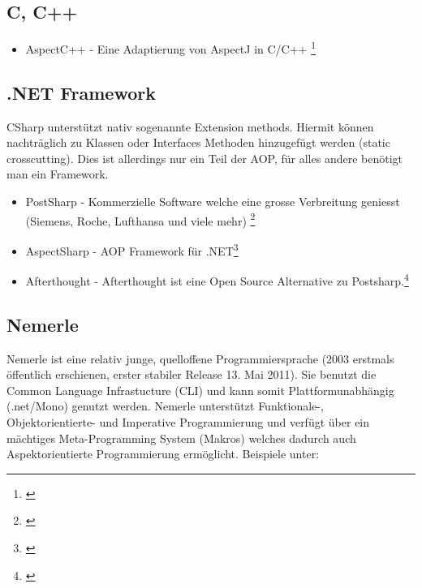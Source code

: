\subsection{C, C++}

\begin{itemize}
\item AspectC++ - Eine Adaptierung von AspectJ in C/C++ \footnote{\cite{net:aspectc}}
\end{itemize}

\subsection{.NET Framework}

CSharp unterstützt nativ sogenannte Extension methods. Hiermit können nachträglich zu Klassen oder Interfaces Methoden hinzugefügt werden (static crosscutting). Dies ist allerdings nur ein Teil der AOP, für alles andere benötigt man ein Framework.

\begin{itemize}
\item PostSharp - Kommerzielle Software welche eine grosse Verbreitung geniesst (Siemens, Roche, Lufthansa und viele mehr) \footnote{\cite{net:postsharp}}
\item AspectSharp - AOP Framework für .NET\footnote{\cite{net:aspectsharp}}
\item Afterthought - Afterthought ist eine Open Source Alternative zu Postsharp.\footnote{\cite{net:afterthought}}
\end{itemize}

\subsection{Nemerle}
Nemerle ist eine relativ junge, quelloffene Programmiersprache (2003 erstmals öffentlich erschienen, erster stabiler Release 13. Mai 2011). Sie benutzt die Common Language Infrastucture (CLI) und kann somit Plattformunabhängig (.net/Mono) genutzt werden. 
Nemerle unterstützt Funktionale-, Objektorientierte- und Imperative Programmierung und verfügt über ein mächtiges Meta-Programming System (Makros) welches dadurch auch Aspektorientierte Programmierung ermöglicht. Beispiele unter: \citet{github:nemerleaopsrc}